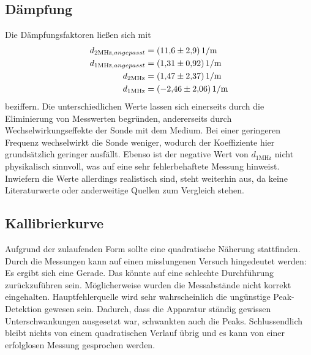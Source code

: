 \subsection{Dämpfung}
Die Dämpfungsfaktoren ließen sich mit 
\begin{align*}
    d_{2 \unit{\mega\hertz},angepasst} &= \qty{11.6(2.9)}{1 \per\meter} \\
    d_{1 \unit{\mega\hertz},angepasst} &= \qty{1.31(0.92)}{1 \per\meter} \\
    d_{2 \unit{\mega\hertz}} &= \qty{1.47 \pm 2.37}{1 \per\meter} \\
    d_{1 \unit{\mega\hertz}} &= \qty{-2.46 \pm 2.06}{1 \per\meter}
\end{align*}
beziffern. Die unterschiedlichen Werte lassen sich einerseits durch die Eliminierung 
von Messwerten begründen, andererseits durch Wechselwirkungseffekte der Sonde 
mit dem Medium. Bei einer geringeren Frequenz wechselwirkt die Sonde weniger, 
wodurch der Koeffiziente hier grundsätzlich geringer ausfällt. Ebenso ist der 
negative Wert von $d_{1 \unit{\mega\hertz}}$ nicht physikalisch sinnvoll, was 
auf eine sehr fehlerbehaftete Messung hinweist. Inwiefern die Werte allerdings 
realistisch sind, steht weiterhin aus, da keine Literaturwerte oder anderweitige 
Quellen zum Vergleich stehen.

\subsection{Kallibrierkurve}
Aufgrund der zulaufenden Form sollte eine quadratische Näherung stattfinden. 
Durch die Messungen kann auf einen misslungenen Versuch hingedeutet werden: 
Es ergibt sich eine Gerade. Das könnte auf eine schlechte Durchführung 
zurückzuführen sein. Möglicherweise wurden die Messabstände nicht korrekt eingehalten.
Hauptfehlerquelle wird sehr wahrscheinlich die ungünstige Peak-Detektion gewesen 
sein. Dadurch, dass die Apparatur ständig gewissen Unterschwankungen ausgesetzt 
war, schwankten auch die Peaks. Schlussendlich bleibt nichts von einem 
quadratischen Verlauf übrig und es kann von einer erfolglosen Messung gesprochen 
werden.